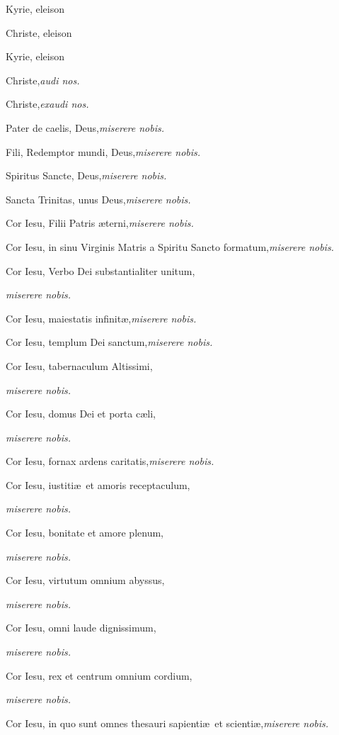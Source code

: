 \documentclass[12pt]{article}\errorcontextlines=9
\begin{document}
\begin{multicols}{2}

Kyrie, eleison

Christe, eleison

Kyrie, eleison

Christe,\hfill\textit{audi nos.}

Christe,\hfill\textit{exaudi nos.}

Pater de caelis, Deus,\hfill\textit{miserere nobis.}

Fili, Redemptor mundi, Deus,\hfill\textit{miserere nobis.}

Spiritus Sancte, Deus,\hfill\textit{miserere nobis.}

Sancta Trinitas, unus Deus,\hfill\textit{miserere nobis.}

Cor Iesu, Filii Patris \ae terni,\hfill\textit{miserere nobis.}

Cor Iesu, in sinu Virginis Matris a Spiritu Sancto formatum,\hfill\textit{miserere nobis.}

Cor Iesu, Verbo Dei substantialiter unitum,

\hfill\textit{miserere nobis.}

Cor Iesu, maiestatis infinit\ae,\hfill\textit{miserere nobis.}

Cor Iesu, templum Dei sanctum,\hfill\textit{miserere nobis.}

Cor Iesu, tabernaculum Altissimi,

\hfill\textit{miserere nobis.}

Cor Iesu, domus Dei et porta c\ae li,

\hfill\textit{miserere nobis.}

Cor Iesu, fornax ardens caritatis,\hfill\textit{miserere nobis.}

Cor Iesu, iustiti\ae\ et amoris receptaculum,

\hfill\textit{miserere nobis.}

Cor Iesu, bonitate et amore plenum,

\hfill\textit{miserere nobis.}

Cor Iesu, virtutum omnium abyssus,

\hfill\textit{miserere nobis.}

Cor Iesu, omni laude dignissimum,

\hfill\textit{miserere nobis.}

Cor Iesu, rex et centrum omnium cordium,

\hfill\textit{miserere nobis.}

Cor Iesu, in quo sunt omnes thesauri sapienti\ae\ et scienti\ae,\hfill\textit{miserere nobis.}


\end{multicols}
\end{document}
